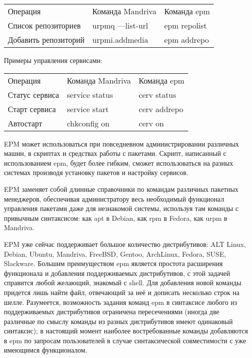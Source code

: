 \documentclass[10pt, a5paper]{article}
\begin{document}
\begin{table}
  \centering
  \begin{tabular}{ l l l }
    Операция & Команда Mandriva & Команда epm \\
    Список репозиториев & urpmq ---list-url & epm repolist \\
    Добавить репозиторий & urpmi.addmedia & epm addrepo \\
  \end{tabular}
\end{table}
Примеры управления сервисами:

\begin{table}
  \centering
  \begin{tabular}{ l l l }
    Операция & Команда Mandriva & Команда epm \\
    Статус сервиса & service status & cerv status \\
    Старт сервиса & service start & cerv addrepo \\
    Автостарт & chkconfig on & cerv on \\
  \end{tabular}
\end{table}
EPM может использоваться при повседневном администрировании различных машин, в скриптах и средствах работы с пакетами. Скрипт, написанный с использованием epm, будет более гибким, сможет использоваться на разных системах производя установку пакетов и настройку сервисов.

EPM заменяет собой длинные справочники по командам различных пакетных менеджеров, обеспечивая администратору весь необходимый функционал управления пакетами даже для незнакомой системы, используя там команды с привычным синтаксисом: как apt в Debian, как rpm в Fedora, как urpm в Mandriva.

EPM уже сейчас поддерживает большое количество дистрибутивов: ALT Linux, Debian, Ubuntu, Mandriva, FreeBSD, Gentoo, ArchLinux, Fedora, SUSE, Slackware. Большим преимуществом epm является простота расширения функционала и добавления поддерживаемых  дистрибутивов, с этой задачей справится любой желающий, знакомый с shell. Для добавления новой команды придется лишь найти файл, отвечающий за неё и дописать несколько строк на шелле.
Разумеется, возможность задания команд epm в синтаксисе любого из поддерживаемых дистрибутивов ограничена пересечениями (иногда две различные по смыслу команды из разных дистрибутивов имеют одинаковый синтаксис); в настоящий момент наиболее востребованные команды добавляются в epm по запросам пользователей в случае синтаксической совместимости с уже имеющимся функционалом.
\end{document}
